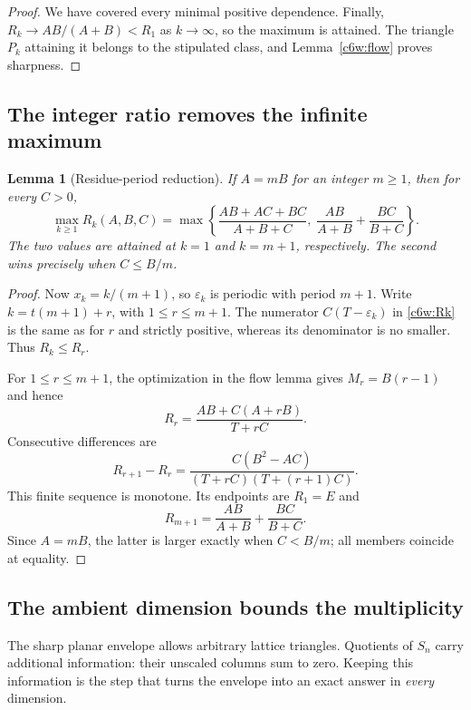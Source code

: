 \documentclass[11pt,a4paper]{article}
\newtheorem{lemma}[theorem]{Lemma}
\theoremstyle{remark}\newtheorem{remark}[theorem]{Remark}
\begin{document}
\begin{proof}
We have covered every minimal positive dependence.  Finally,
$R_k\to AB/(A+B)<R_1$ as $k\to\infty$, so the maximum is attained.
The triangle $P_k$ attaining it belongs to the stipulated class,
and Lemma~\ref{c6w:flow} proves sharpness.
\end{proof}

\subsection{The integer ratio removes the infinite maximum}

\begin{lemma}[Residue-period reduction]\label{c6w:period}
If $A=mB$ for an integer $m\ge1$, then for every $C>0$,
\begin{equation}\label{c6w:periodmax}
 \max_{k\ge1}R_k(A,B,C)
 =\max\left\{
 \frac{AB+AC+BC}{A+B+C},\;
 \frac{AB}{A+B}+\frac{BC}{B+C}
 \right\}.
\end{equation}
The two values are attained at $k=1$ and $k=m+1$, respectively.
The second wins precisely when $C\le B/m$.
\end{lemma}

\begin{proof}
Now $x_k=k/(m+1)$, so $\varepsilon_k$ is periodic with period
$m+1$.  Write $k=t(m+1)+r$, with $1\le r\le m+1$.  The numerator
$C(T-\varepsilon_k)$ in \eqref{c6w:Rk} is the same as for $r$
and strictly positive, whereas its denominator is no smaller.
Thus $R_k\le R_r$.

For $1\le r\le m+1$, the optimization in the flow lemma gives
$M_r=B(r-1)$ and hence
\[
 R_r=\frac{AB+C(A+rB)}{T+rC}.
\]
Consecutive differences are
\[
 R_{r+1}-R_r
 =\frac{C(B^2-AC)}{(T+rC)(T+(r+1)C)}.
\]
This finite sequence is monotone.  Its endpoints are $R_1=E$
and
\[
 R_{m+1}=\frac{AB}{A+B}+\frac{BC}{B+C}.
\]
Since $A=mB$, the latter is larger exactly when $C<B/m$;
all members coincide at equality.
\end{proof}

\subsection{The ambient dimension bounds the multiplicity}

The sharp planar envelope allows arbitrary lattice triangles.
Quotients of $S_n$ carry additional information: their unscaled
columns sum to zero.  Keeping this information is the step that
turns the envelope into an exact answer in \emph{every} dimension.
\end{document}
